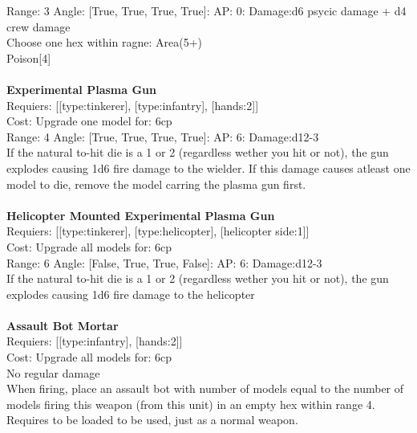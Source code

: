 Range: 3  Angle: [True, True, True, True]: AP: 0: Damage:d6 psycic damage + d4 crew damage \\
Choose one hex within ragne: Area(5+)\\ 
Poison[4]\\ 








\ \\
{\bf Experimental Plasma Gun } \\

Requiers: [[type:tinkerer], [type:infantry], [hands:2]] \\
Cost: Upgrade one model for: 6cp \\


Range: 4  Angle: [True, True, True, True]: AP: 6: Damage:d12-3 \\
If the natural to-hit die is a 1 or 2 (regardless wether you hit or not), the gun explodes causing 1d6 fire damage to the wielder. If this damage causes atleast one model to die, remove the model carring the plasma gun first.\\ 








\ \\
{\bf Helicopter Mounted Experimental Plasma Gun } \\

Requiers: [[type:tinkerer], [type:helicopter], [helicopter side:1]] \\
Cost: Upgrade all models for: 6cp \\


Range: 6  Angle: [False, True, True, False]: AP: 6: Damage:d12-3 \\
If the natural to-hit die is a 1 or 2 (regardless wether you hit or not), the gun explodes causing 1d6 fire damage to the helicopter\\ 








\ \\
{\bf Assault Bot Mortar } \\

Requiers: [[type:infantry], [hands:2]] \\
Cost: Upgrade all models for: 6cp \\
No regular damage\\ 
When firing, place an assault bot with number of models equal to the number of models firing this weapon (from this unit) in an empty hex within range 4. Requires to be loaded to be used, just as a normal weapon.\\ 









